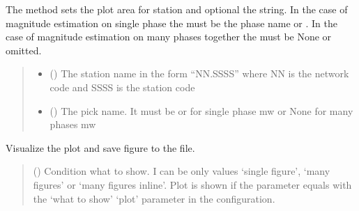 \documentclass[letterpaper,10pt,english]{sphinxmanual}
\begin{document}
\begin{fulllineitems}
\begin{fulllineitems}
\label{\detokenize{api_support:amw.mw.plot.PlotMw.set_plot}}
\pysigstartsignatures
{}
\pysigstopsignatures
\sphinxAtStartPar
The method sets the plot area for station and optional the string.
In the case of magnitude estimation on single phase the  must be the phase name  or .
In the case of magnitude estimation on many phases together the  must be None or omitted.
\begin{quote}\begin{description}
\begin{itemize}
\item {} 
\sphinxAtStartPar
{} () \textendash{} The station name in the form “NN.SSSS” where NN is the network
code and SSSS is the station code

\item {} 
\sphinxAtStartPar
{} () \textendash{} The pick name. It must be  or  for single phase mw or None for many phases mw

\end{itemize}

\end{description}\end{quote}

\end{fulllineitems}


\begin{fulllineitems}
\label{\detokenize{api_support:amw.mw.plot.PlotMw.show_plot}}
\pysigstartsignatures
{}
\pysigstopsignatures
\sphinxAtStartPar
Visualize the plot and save figure to the file.
\begin{quote}\begin{description}
\sphinxAtStartPar
{} () \textendash{} Condition what to show. I can be only values ‘single figure’, ‘many figures’ or
‘many figures inline’. Plot is shown if the parameter equals with the ‘what to show’ ‘plot’
parameter in the configuration.


\end{description}
\end{quote}
\end{fulllineitems}
\end{fulllineitems}
\end{document}

